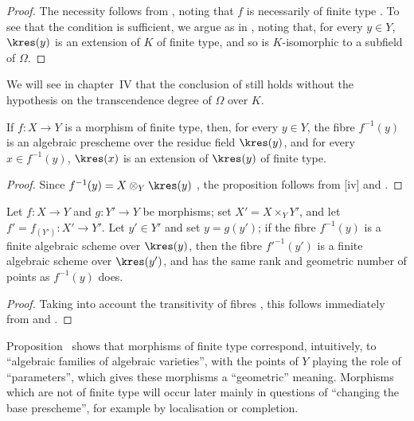 \begin{proof}
The necessity follows from , noting that $f$ is necessarily of finite type .
To see that the condition is sufficient, we argue as in , noting that, for every $y\in Y$, $\kres(y)$ is an extension of $K$ of finite type, and so is $K$-isomorphic to a subfield of $\Omega$.
\end{proof}

\begin{remark}[6.4.10]
\label{I.6.4.10}
We will see in chapter~IV that the conclusion of  still holds without the hypothesis on the transcendence degree of $\Omega$ over $K$.
\end{remark}

\begin{proposition}[6.4.11]
\label{I.6.4.11}
If $f:X\to Y$ is a morphism of finite type, then, for every $y\in Y$, the fibre $f^{-1}(y)$ is an algebraic prescheme over the residue field $\kres(y)$, and for every $x\in f^{-1}(y)$, $\kres(x)$ is an extension of $\kres(y)$ of finite type.
\end{proposition}

\begin{proof}
Since $f^{-1}(y)=X\otimes_Y\kres(y)$ , the proposition follows from [iv] and .
\end{proof}

\begin{proposition}[6.4.12]
\label{I.6.4.12}
Let $f:X\to Y$ and $g:Y'\to Y$ be morphisms;
set $X'=X\times_Y Y'$, and let $f'=f_{(Y')}:X'\to Y'$.
Let $y'\in Y'$ and set $y=g(y')$;
if the fibre $f^{-1}(y)$ is a finite algebraic scheme over $\kres(y)$, then the fibre $f'^{-1}(y')$ is a finite algebraic scheme over $\kres(y')$, and has the same rank and geometric number of points as $f^{-1}(y)$ does.
\end{proposition}

\begin{proof}
Taking into account the transitivity of fibres , this follows immediately from  and .
\end{proof}

\begin{env}[6.4.13]
\label{I.6.4.13}
Proposition~ shows that morphisms of finite type correspond, intuitively, to ``algebraic families of algebraic varieties'', with the points of $Y$ playing the
role of ``parameters'', which gives these morphisms a ``geometric'' meaning.
Morphisms which are not of finite type will occur later mainly in questions of ``changing the base prescheme'', for example by localisation or completion.
\end{env}


